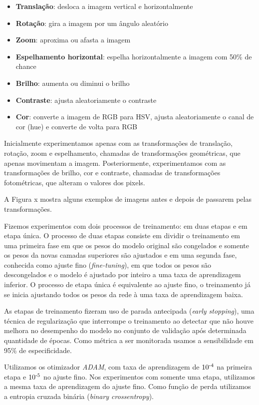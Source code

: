 \documentclass[12pt]{article}
\begin{document}
\begin{itemize}[noitemsep]
    \item \textbf{Translação}: desloca a imagem vertical e horizontalmente
    \item \textbf{Rotação}: gira a imagem por um ângulo aleatório
    \item \textbf{Zoom}: aproxima ou afasta a imagem
    \item \textbf{Espelhamento horizontal}: espelha horizontalmente a imagem com 50\% de chance
    \item \textbf{Brilho}: aumenta ou diminui o brilho
    \item \textbf{Contraste}: ajusta aleatoriamente o contraste
    \item \textbf{Cor}: converte a imagem de RGB para HSV, ajusta aleatoriamente o canal de cor (hue) e converte de volta para RGB
\end{itemize}

Inicialmente experimentamos apenas com as transformações de translação, rotação, zoom e espelhamento, chamadas de transformações geométricas, que apenas movimentam a imagem. Posteriormente, experimentamos com as transformações de brilho, cor e contraste, chamadas de transformações fotométricas, que alteram o valores dos pixels.

A Figura x mostra alguns exemplos de imagens antes e depois de passarem pelas transformações.

Fizemos experimentos com dois processos de treinamento: em duas etapas e em etapa única. O processo de duas etapas consiste em dividir o treinamento em uma primeira fase em que os pesos do modelo original são congelados e somente os pesos da novas camadas superiores são ajustados e em uma segunda fase, conhecida como ajuste fino (\emph{fine-tuning}), em que todos os pesos são descongelados e o modelo é ajustado por inteiro a uma taxa de aprendizagem inferior. O processo de etapa única é equivalente ao ajuste fino, o treinamento já se inicia ajustando todos os pesos da rede à uma taxa de aprendizagem baixa.

As etapas de treinamento fizeram uso de parada antecipada (\emph{early stopping}), uma técnica de regularização que interrompe o treinamento ao detectar que não houve melhora no desempenho do modelo no conjunto de validação após determinada quantidade de épocas. Como métrica a ser monitorada usamos a sensibilidade em 95\% de especificidade.

Utilizamos os otimizador \emph{ADAM}, com taxa de aprendizagem de $10\textsuperscript{-4}$ na primeira etapa e $10\textsuperscript{-5}$ no ajuste fino. Nos experimentos com somente uma etapa, utilizamos a mesma taxa de aprendizagem do ajuste fino. Como função de perda utilizamos a entropia cruzada binária (\emph{binary crossentropy}).
\end{document}
